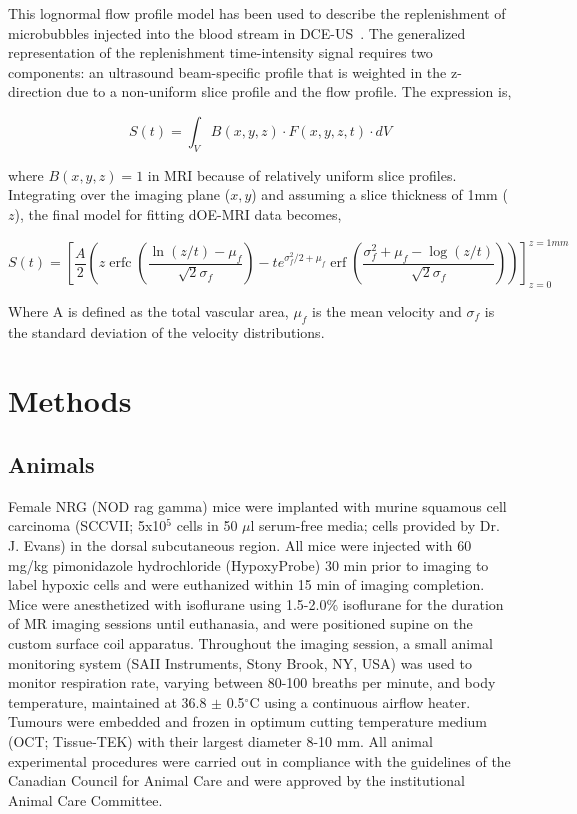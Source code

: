 This lognormal flow profile model has been used to describe the replenishment of microbubbles injected into the blood stream in \ac{DCE-US}~\cite{Hudson:2009jv}.
The generalized representation of the replenishment time-intensity signal requires two components: an ultrasound beam-specific profile that is weighted in the z-direction due to a non-uniform slice profile and the flow profile. 
The expression is,

\begin{equation}
S(t) = \int_{V} B(x,y,z) \cdot F(x,y,z,t) \cdot dV
\end{equation}

where $B(x,y,z) = 1$ in MRI because of relatively uniform slice profiles. 
Integrating over the imaging plane ($x,y$) and assuming a slice thickness of 1mm ($z$), the final model for fitting \ac{dOE-MRI} data becomes,

\begin{equation}
S(t)= \left[\frac{A}{2}\left(z \operatorname{erfc}\left(\frac{\ln \left(z/t\right)-\mu_f}{\sqrt{2} \sigma_f}\right)-t e^{\sigma_f^{2} / 2+\mu_f} \operatorname{erf}\left(\frac{\sigma_f^{2}+\mu_f-\log \left(z/t\right)}{\sqrt{2} \sigma_f}\right)\right)\right]_{z=0}^{z=1mm}
\label{lognormalFitEquation}
\end{equation}

Where A is defined as the total vascular area, $\mu_f$ is the mean velocity and $\sigma_f$ is the standard deviation of the velocity distributions. 

\section{Methods}
\subsection{Animals}
Female NRG (NOD rag gamma) mice were implanted with murine squamous cell carcinoma (SCCVII; 5x10$^5$ cells in 50 $\mu$l serum-free media; cells provided by Dr. J. Evans) in the dorsal subcutaneous region.
All mice were injected with 60 mg/kg pimonidazole hydrochloride (HypoxyProbe) 30 min prior to imaging to label hypoxic cells and were euthanized within 15 min of imaging completion.
Mice were anesthetized with isoflurane using 1.5-2.0\% isoflurane for the duration of MR imaging sessions until euthanasia, and were positioned supine on the custom surface coil apparatus.
Throughout the imaging session, a small animal monitoring system (SAII Instruments, Stony Brook, NY, USA) was used to monitor respiration rate, varying between 80-100 breaths per minute, and body temperature, maintained at 36.8 $\pm$ 0.5$^\circ$C using a continuous airflow heater. 
Tumours were embedded and frozen in optimum cutting temperature medium (OCT; Tissue-TEK) with their largest diameter 8-10 mm.
All animal experimental procedures were carried out in compliance with the guidelines of the Canadian Council for Animal Care and were approved by the institutional Animal Care Committee.

